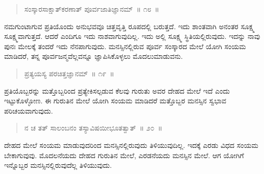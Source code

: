 \begin{verse}
ಸಂಸ್ಕಾರಸಾಕ್ಷಾತ್​ಕರಣಾತ್​ ಪೂರ್ವಜಾತಿಜ್ಞಾನಮ್​~॥ ೧೮~॥
\end{verse}

\vspace{-0.4cm}


\vskip 0.2cm

ನಮಗುಂಟಾಗುವ ಪ್ರತಿಯೊಂದು ಅನುಭವವೂ ಚಿತ್ತವೃತ್ತಿ ರೂಪದಲ್ಲಿ ಬರುತ್ತದೆ. ಇದು ಶಾಂತವಾಗಿ ಅನಂತರ ಸೂಕ್ಷ್ಮ ಸೂಕ್ಷ್ಮವಾಗುತ್ತದೆ. ಆದರೆ ಎಂದಿಗೂ ಇದು ನಾಶವಾಗುವುದಿಲ್ಲ. ಇದು ಅಲ್ಲಿ ಸೂಕ್ಷ್ಮ ಸ್ಥಿತಿಯಲ್ಲಿರುವುದು. ಇದನ್ನು ನಾವು ಪುನಃ ಮೇಲಕ್ಕೆ ತಂದರೆ ಇದು ನೆನಪಾಗುವುದು. ಮನಸ್ಸಿನಲ್ಲಿರುವ ಪೂರ್ವ ಸಂಸ್ಕಾರದ ಮೇಲೆ ಯೋಗಿ ಸಂಯಮ ಮಾಡಿದರೆ, ತನ್ನ ಪೂರ್ವಜನ್ಮವೆಲ್ಲವನ್ನೂ ಜ್ಞಾಪಿಸಿಕೊಳ್ಳಲು ಮೊದಲುಮಾಡುವನು. 


\vspace{-0.3cm}


\begin{verse}
ಪ್ರತ್ಯಯಸ್ಯ ಪರಚಿತ್ತಜ್ಞಾನಮ್​~॥ ೧೯~॥
\end{verse}

\vspace{-0.4cm}


\vspace{0.1cm}

ಪ್ರತಿಯೊಬ್ಬರನ್ನು ಮತ್ತೊಬ್ಬರಿಂದ ಪ್ರತ್ಯೇಕಿಸಲ್ಪಡುವ ಕೆಲವು ಗುರುತು ಅವರ ದೇಹದ ಮೇಲೆ ಇದೆ ಎಂದು ಇಟ್ಟುಕೊಳ್ಳೋಣ. ಈ ಗುರುತಿನ ಮೇಲೆ ಯೋಗಿ ಸಂಯಮ ಮಾಡಿದರೆ ಮತ್ತೊಬ್ಬರ ಮನಸ್ಸಿನ ಸ್ವಭಾವ ಪರಿಚಯವಾಗುವುದು. 

\vspace{-0.2cm}

\begin{verse}
ನ ಚ ತತ್​ ಸಾಲಂಬನಂ ತಸ್ಯಾವಿಷಯೀಭೂತತ್ವಾತ್​~॥ ೨೦~॥
\end{verse}

\vspace{-0.4cm}


\vspace{0.2cm}

ದೇಹದ ಮೇಲೆ ಸಂಯಮ ಮಾಡುವುದರಿಂದ ಮನಸ್ಸಿನಲ್ಲಿರುವುದು ತಿಳಿಯುವುದಿಲ್ಲ. ಇದಕ್ಕೆ ಎರಡು ವಿಧದ ಸಂಯಮ ಬೇಕಾಗುವುವು. ಮೊದಲನೆಯದು ದೇಹದ ಗುರುತಿನ ಮೇಲೆ, ಎರಡನೆಯದು ಮನಸ್ಸಿನ ಮೇಲೆ. ಆಗ ಯೋಗಿಗೆ ಇನ್ನೊಬ್ಬರ ಮನಸ್ಸಿನಲ್ಲಿರುವುದೆಲ್ಲ ತಿಳಿಯುವುದು. 

\vspace{-0.3cm}

